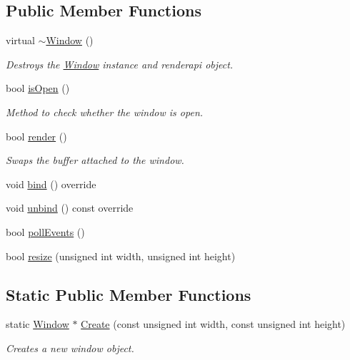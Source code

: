 \subsection*{Public Member Functions}
\begin{DoxyCompactItemize}
\item 
virtual \hyperlink{classpcs_1_1Window_a579734a5cb40ca904947eed2f5a853bf}{$\sim$\+Window} ()
\begin{DoxyCompactList}\small\item\em Destroys the \hyperlink{classpcs_1_1Window}{Window} instance and renderapi object. \end{DoxyCompactList}\item 
bool \hyperlink{classpcs_1_1Window_a594d19fb488754f3e863e982ad540928}{is\+Open} ()
\begin{DoxyCompactList}\small\item\em Method to check whether the window is open. \end{DoxyCompactList}\item 
bool \hyperlink{classpcs_1_1Window_a13464abf63b4b42578628ac0e7f2a141}{render} ()
\begin{DoxyCompactList}\small\item\em Swaps the buffer attached to the window. \end{DoxyCompactList}\item 
void \hyperlink{classpcs_1_1Window_aa6e00bee6910b3146481dee7aab69cfb}{bind} () override
\item 
void \hyperlink{classpcs_1_1Window_a4d103be3712fbb051d7c4d446a266de0}{unbind} () const override
\item 
bool \hyperlink{classpcs_1_1Window_a3017fae4b567ecad9f41189b9b8f0281}{poll\+Events} ()
\item 
bool \hyperlink{classpcs_1_1Window_a4918cb448c1b50b85b2cd5cbcb2d767e}{resize} (unsigned int width, unsigned int height)
\end{DoxyCompactItemize}
\subsection*{Static Public Member Functions}
\begin{DoxyCompactItemize}
\item 
static \hyperlink{classpcs_1_1Window}{Window} $\ast$ \hyperlink{classpcs_1_1Window_af7ab7d729e559b42fb723c57670623da}{Create} (const unsigned int width, const unsigned int height)
\begin{DoxyCompactList}\small\item\em Creates a new window object. \end{DoxyCompactList}\end{DoxyCompactItemize}
